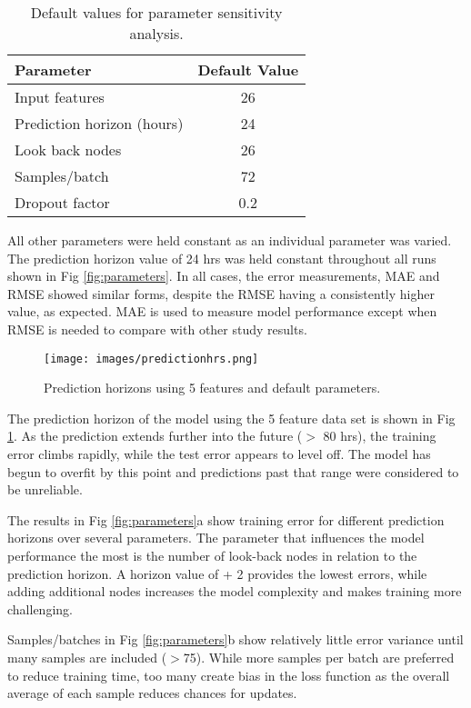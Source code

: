 \documentclass[preprint,12pt,a4paper,authoryear]{elsarticle}
\begin{document}
\begin{table}[]
\centering
\caption{Default values for parameter sensitivity analysis.}
\label{tb:default-parameter}
\begin{tabular}{@{}lc@{}}
\toprule
\textbf{Parameter} & \textbf{Default Value} \\ \midrule
Input features & 26 \\
Prediction horizon (hours) & 24 \\
Look back nodes & 26 \\
Samples/batch & 72 \\
Dropout factor & 0.2 \\ \bottomrule
\end{tabular}
\end{table}
\begin{linenumbers}
%
All other parameters were held constant as an individual parameter was varied. The prediction horizon value of 24 hrs was held constant throughout all runs shown in  Fig \ref{fig:parameters}. In all cases, the error measurements, MAE and RMSE showed similar forms, despite the RMSE having a consistently higher value, as expected. MAE is used to measure model performance except when RMSE is needed to compare with other study results.  

%
\begin{figure}[H]
\centering
\texttt{[image: images/predictionhrs.png]}  %
\caption{Prediction horizons using 5 features and default parameters.}
\label{fig:predictionhrs}
\end{figure}
%
The prediction horizon of the model using the 5 feature data set is shown in Fig \ref{fig:predictionhrs}.  As the prediction extends further into the future ($>$ 80 hrs), the training error climbs rapidly, while the test error appears to level off. The model has begun to overfit by this point and predictions past that range were considered to be unreliable.

The results in  Fig \ref{fig:parameters}a show training error for different prediction horizons over several parameters. The parameter that influences the model performance the most is the number of look-back nodes in relation to the prediction horizon. A horizon value of + 2 provides the lowest errors, while adding additional nodes increases the model complexity and makes training more challenging. 

Samples/batches in Fig \ref{fig:parameters}b show relatively little error variance until many samples are included ($>$75). While more samples per batch are preferred to reduce training time, too many create bias in the loss function as the overall average of each sample reduces chances for updates.


\end{linenumbers}
\end{document}

